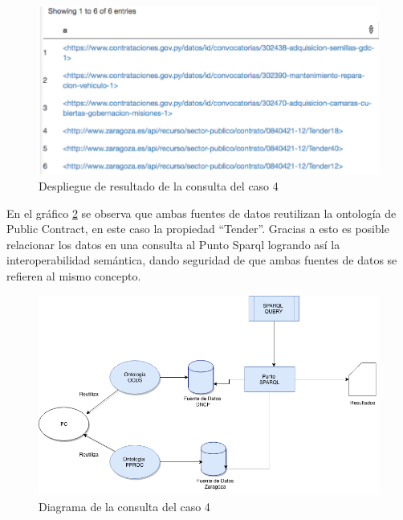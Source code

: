 \begin{figure}[h!]
    \centering
    \includegraphics[width=150mm]{figuras/caso4Resultado.png}
    \caption{Despliegue de resultado de la consulta del caso 4}
    \label{img:caso4Resultado}
 \end{figure}


 En el gráfico \ref{img:Diagramas-Caso 4} se observa que ambas fuentes de datos reutilizan la ontología de Public Contract, en este caso la propiedad “Tender”. Gracias a esto es posible relacionar los datos en una consulta al Punto Sparql logrando así la interoperabilidad semántica, dando seguridad de que ambas fuentes de datos se refieren al mismo concepto.

 \begin{figure}[h!]
    \centering
    \includegraphics[width=150mm]{figuras/Diagramas-Caso 4.png}
    \caption{Diagrama de la consulta del caso 4}
    \label{img:Diagramas-Caso 4}
 \end{figure}
